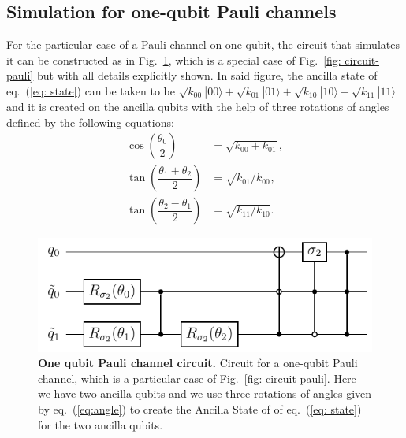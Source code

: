 \documentclass[10pt,letterpaper]{article} %
\newcommand{\fref}[1]{Fig.~\ref{#1}}
\newcommand{\eref}[1]{eq.~(\ref{#1})}
\begin{document}
 


\subsection{Simulation for one-qubit Pauli channels} %
\label{subsec: Simulation for one-qubit Pauli channels}

For the particular case of a Pauli channel on one qubit, the circuit that
simulates it can be constructed as in \fref{fig: circuit-pauli-1},
which is a special case of \fref{fig: circuit-pauli}
but with all details  explicitly shown.
In said figure, the ancilla state
of \eref{eq: state} can be taken to be
$\sqrt{k_{00}} |00\rangle + \sqrt{k_{01}} |01\rangle + \sqrt{k_{10}} 
|10\rangle + \sqrt{k_{11}}|11\rangle$
and it is created on the ancilla qubits with the help of three rotations of angles
defined by the following equations:
\begin{align*}
\cos\left(\dfrac{\theta_0}{2} \right) &= \sqrt{k_{00} + k_{01}},\\
\tan\left( \dfrac{\theta_1 + \theta_2}{2} \right) &= \sqrt{k_{01}/k_{00}}, \\
\tan\left( \dfrac{\theta_2 - \theta_1}{2} \right) &= \sqrt{k_{11}/k_{10}}.
\end{align*}

\begin{figure} %
\centering
\includegraphics{images/circuito_unqubit.pdf}
\caption{
{\bf One qubit Pauli channel circuit.} Circuit for a one-qubit Pauli channel,
which is a particular case of \fref{fig: circuit-pauli}.  Here we have two
ancilla qubits and we use three rotations
of angles given by \eref{eq:angle} to create the Ancilla State of
of \eref{eq: state} for the two ancilla qubits.
}
\label{fig: circuit-pauli-1} 
\end{figure} %
\end{document}
